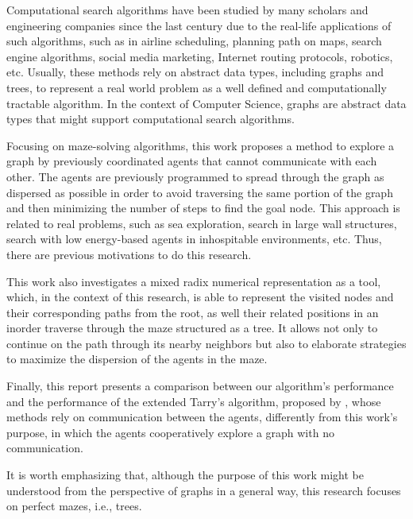 Computational search algorithms have been studied by many scholars and engineering companies since the last century due to the real-life applications of such algorithms, such as in airline scheduling, planning path on maps, search engine algorithms, social media marketing, Internet routing protocols, robotics, etc. Usually, these methods rely on abstract data types, including graphs and trees, to represent a real world problem as a well defined and computationally tractable algorithm. In the context of Computer Science, graphs are abstract data types that might support computational search algorithms.

Focusing on maze-solving algorithms, this work proposes a method to explore a graph by previously coordinated agents that cannot communicate with each other. The agents are previously programmed to spread through the graph as dispersed as possible in order to avoid traversing the same portion of the graph and then minimizing the number of steps to find the goal node. This approach is related to real problems, such as sea exploration, search in large wall structures, search with low energy-based agents in inhospitable environments, etc. Thus, there are previous motivations to do this research.

This work also investigates a mixed radix numerical representation as a tool, which, in the context of this research, is able to represent the visited nodes and their corresponding paths from the root, as well their related positions in an inorder traverse through the maze structured as a tree. It allows not only to continue on the path through its nearby neighbors but also to elaborate strategies to maximize the dispersion of the agents in the maze.

Finally, this report presents a comparison between our algorithm's performance and the performance of the extended Tarry's algorithm, proposed by , whose methods rely on communication between the agents, differently from this work's purpose, in which the agents cooperatively explore a graph with no communication.

It is worth emphasizing that, although the purpose of this work might be understood from the perspective of graphs in a general way, this research focuses on perfect mazes, i.e., trees.
